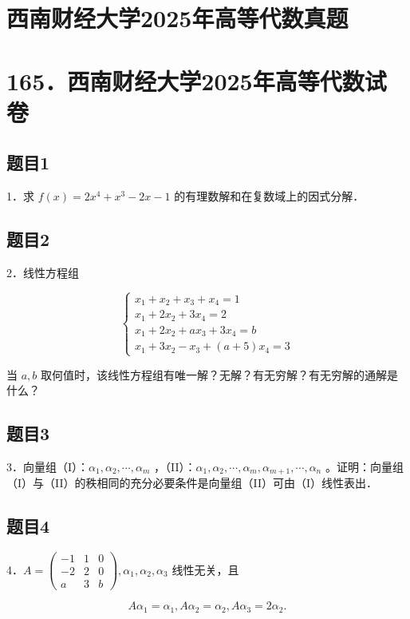 \documentclass{article}
\begin{document}
\section*{西南财经大学2025年高等代数真题}
\section*{165．西南财经大学2025年高等代数试卷}

\subsection{题目1}
1．求 \(f(x)=2 x^{4}+x^{3}-2 x-1\) 的有理数解和在复数域上的因式分解．

\subsection{题目2}
2．线性方程组

\[
\left\{\begin{array}{l}
x_{1}+x_{2}+x_{3}+x_{4}=1 \\
x_{1}+2 x_{2}+3 x_{4}=2 \\
x_{1}+2 x_{2}+a x_{3}+3 x_{4}=b \\
x_{1}+3 x_{2}-x_{3}+(a+5) x_{4}=3
\end{array}\right.
\]

当 \(a, b\) 取何值时，该线性方程组有唯一解？无解？有无穷解？有无穷解的通解是什么？

\subsection{题目3}
3．向量组（I）：\(\alpha_{1}, \alpha_{2}, \cdots, \alpha_{m}\) ，（II）：\(\alpha_{1}, \alpha_{2}, \cdots, \alpha_{m}, \alpha_{m+1}, \cdots, \alpha_{n}\) 。证明：向量组（I）与（II）的秩相同的充分必要条件是向量组（II）可由（I）线性表出．

\subsection{题目4}
4．\(A=\left(\begin{array}{rrr}-1 & 1 & 0 \\ -2 & 2 & 0 \\ a & 3 & b\end{array}\right), \alpha_{1}, \alpha_{2}, \alpha_{3}\) 线性无关，且

\[
A \alpha_{1}=\alpha_{1}, A \alpha_{2}=\alpha_{2}, A \alpha_{3}=2 \alpha_{2} .
\]
\end{document}
